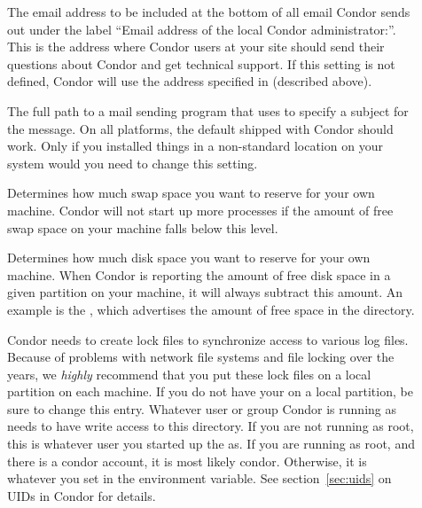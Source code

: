 \begin{description}
\item[] \label{param:CondorSupportEmail}
  The email address to be included at the bottom of all email Condor
  sends out under the label ``Email address of the local Condor
  administrator:''.  
  This is the address where Condor users at your site should send
  their questions about Condor and get technical support.
  If this setting is not defined, Condor will use the address
  specified in  (described above).

\item[] \label{param:Mail} The full path to a mail
  sending program that uses  to
  specify a subject for the message.  On all platforms,
  the default shipped with Condor should work.  Only if you
  installed things in a non-standard location on your system would you
  need to change this setting.
  
\item[] \label{param:ReservedSwap} Determines
  how much swap space you want to reserve for your own
  machine.  Condor will not start up more  processes if
  the amount of free swap space on your machine falls below this
  level. 

\item[] \label{param:ReservedDisk} Determines
  how much disk space you want to reserve for your own
  machine.  When Condor is reporting the amount of free disk space in
  a given partition on your machine, it will always subtract this
  amount.  An example is the , which
  advertises the amount of
  free space in the  directory.
  
\item[] \label{param:Lock} Condor needs to create
  lock files to synchronize access to various log files.  Because of
  problems with network file systems and file locking over
  the years, we \emph{highly} recommend that you put these lock
  files on a local partition on each machine.  If you do not have your
   on a local partition, be sure to change this
  entry.  Whatever user or group Condor is running as needs to have
  write access to this directory.  If you are not running as root, this
  is whatever user you started up the  as.  If you are
  running as root, and there is a condor account, it is most
  likely condor.
  Otherwise, it is whatever you set in the 
  environment variable.  See section~\ref{sec:uids} on UIDs in
  Condor for details.


\end{description}
